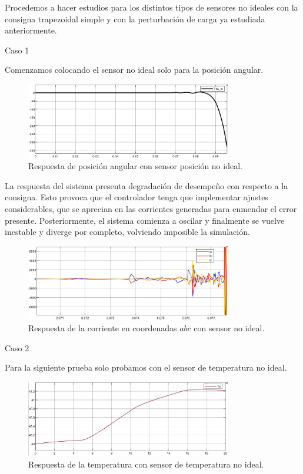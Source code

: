 \documentclass{article}
\begin{document}
Procedemos a hacer estudios para los distintos tipos de sensores no ideales con la consigna trapezoidal 
simple y con la perturbación de carga ya estudiada anteriormente.

\bullet Caso 1

Comenzamos colocando el sensor no ideal solo para la posición angular. 

\begin{figure}[H]
    \centering
    \includegraphics[width=0.8\textwidth]{5.2.5.d.1.png}
    \caption{Respuesta de posición angular con sensor posición no ideal.}
\end{figure}

La respuesta del sistema presenta degradación de desempeño con respecto a la consigna. Esto provoca 
que el controlador tenga que implementar ajustes considerables, que se aprecian en las corrientes 
generadas para enmendar el error presente. Posteriormente, el sistema comienza a oscilar y 
finalmente se vuelve inestable y diverge por completo, volviendo imposible la simulación.

\begin{figure}[H]
    \centering
    \includegraphics[width=0.8\textwidth]{5.2.5.d.2.png}
    \caption{Respuesta de la corriente en coordenadas $abc$ con sensor no ideal.}
\end{figure}

\bullet Caso 2

Para la siguiente prueba solo probamos con el sensor de temperatura no ideal.

\begin{figure}[H]
    \centering
    \includegraphics[width=0.8\textwidth]{5.2.5.d.3.png}
    \caption{Respuesta de la temperatura con sensor de temperatura no ideal.}
\end{figure}
\end{document}

